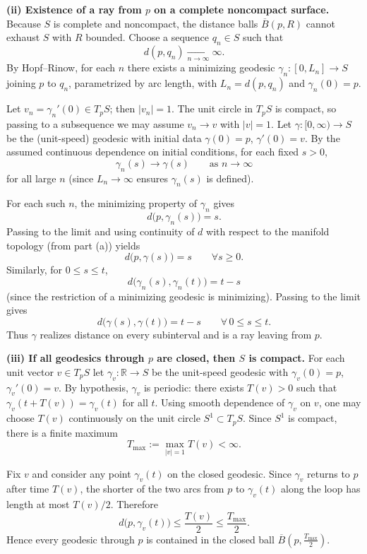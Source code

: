\begin{solution}
	\smallskip
	\textbf{(ii) Existence of a ray from $p$ on a complete noncompact surface.}
	Because $S$ is complete and noncompact, the distance balls $\overline B(p,R)$ cannot exhaust $S$ with $R$ bounded.
	Choose a sequence $q_n\in S$ such that
	\[
	d(p,q_n)\xrightarrow[n\to\infty]{}\infty.
	\]
	By Hopf--Rinow, for each $n$ there exists a minimizing geodesic $\gamma_n:[0,L_n]\to S$ joining $p$ to $q_n$, parametrized by arc length,
	with $L_n=d(p,q_n)$ and $\gamma_n(0)=p$.
	
	Let $v_n=\gamma_n'(0)\in T_pS$; then $|v_n|=1$. The unit circle in $T_pS$ is compact, so passing to a subsequence we may assume
	$v_n\to v$ with $|v|=1$.
	Let $\gamma:[0,\infty)\to S$ be the (unit-speed) geodesic with initial data $\gamma(0)=p$, $\gamma'(0)=v$.
	By the assumed continuous dependence on initial conditions, for each fixed $s>0$,
	\[
	\gamma_n(s)\to \gamma(s)\qquad\text{as }n\to\infty
	\]
	for all large $n$ (since $L_n\to\infty$ ensures $\gamma_n(s)$ is defined).
	
	For each such $n$, the minimizing property of $\gamma_n$ gives
	\[
	d\bigl(p,\gamma_n(s)\bigr)=s.
	\]
	Passing to the limit and using continuity of $d$ with respect to the manifold topology (from part (a)) yields
	\[
	d\bigl(p,\gamma(s)\bigr)=s\qquad\forall s\ge 0.
	\]
	Similarly, for $0\le s\le t$,
	\[
	d\bigl(\gamma_n(s),\gamma_n(t)\bigr)=t-s
	\]
	(since the restriction of a minimizing geodesic is minimizing). Passing to the limit gives
	\[
	d\bigl(\gamma(s),\gamma(t)\bigr)=t-s\qquad\forall\,0\le s\le t.
	\]
	Thus $\gamma$ realizes distance on every subinterval and is a ray leaving from $p$.
	
	\smallskip
	\textbf{(iii) If all geodesics through $p$ are closed, then $S$ is compact.}
	For each unit vector $v\in T_pS$ let $\gamma_v:\mathbb R\to S$ be the unit-speed geodesic with $\gamma_v(0)=p$, $\gamma_v'(0)=v$.
	By hypothesis, $\gamma_v$ is periodic: there exists $T(v)>0$ such that $\gamma_v(t+T(v))=\gamma_v(t)$ for all $t$.
	Using smooth dependence of $\gamma_v$ on $v$, one may choose $T(v)$ continuously on the unit circle $S^1\subset T_pS$.
	Since $S^1$ is compact, there is a finite maximum
	\[
	T_{\max}:=\max_{|v|=1} T(v)<\infty.
	\]
	
	Fix $v$ and consider any point $\gamma_v(t)$ on the closed geodesic. Since $\gamma_v$ returns to $p$ after time $T(v)$,
	the shorter of the two arcs from $p$ to $\gamma_v(t)$ along the loop has length at most $T(v)/2$. Therefore
	\[
	d\bigl(p,\gamma_v(t)\bigr)\le \frac{T(v)}{2}\le \frac{T_{\max}}{2}.
	\]
	Hence every geodesic through $p$ is contained in the closed ball $\overline B\!\left(p,\tfrac{T_{\max}}{2}\right)$.
	

\end{solution}
